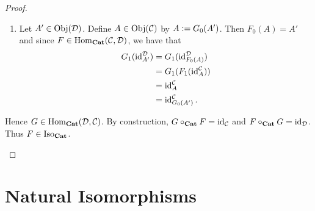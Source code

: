 \documentclass{book}
\begin{document}
\begin{proof}
\begin{itemize}
\begin{enumerate}
\begin{align*}
					G_1(g' \circ_{\MD} f')
					& = G_1(F_1(g) \circ_{\MD} F_1(f)) \\
					& = G_1(F_1( g \circ_{\MC} f)) \\
					& = g \circ_{\MC} f \\
					& = G_1(g') \circ_{\MC} G_1(f').
				\end{align*}
				\item Let $A' \in \operatorname{Obj}(\mathcal{D})$. Define $A \in \operatorname{Obj}(\mathcal{C})$ by $A \vcentcolon= G_0(A')$. Then $F_0(A) = A'$ and since $F \in \operatorname{Hom}_{\operatorname*{\text{\textbf{Cat}}}}(\mathcal{C}, \mathcal{D})$, we have that
				\begin{align*}
					G_1(\operatorname{id}_{A'}^{\mathcal{D}})
					& = G_1(\operatorname{id}_{F_0(A)}^{\mathcal{D}}) \\
					& = G_1(F_1(\operatorname{id}_A^{\mathcal{C}})) \\
					& = \operatorname{id}_A^{\mathcal{C}} \\
					& = \operatorname{id}_{G_0(A')}^{\mathcal{C}}. 
				\end{align*}
			\end{enumerate}
			Hence $G \in \operatorname{Hom}_{\operatorname*{\text{\textbf{Cat}}}}(\mathcal{D}, \mathcal{C})$. By construction, $G \circ_{\operatorname*{\text{\textbf{Cat}}}} F = \operatorname{id}_{\mathcal{C}}$ and $F \circ_{\operatorname*{\text{\textbf{Cat}}}} G = \operatorname{id}_{\mathcal{D}}$. Thus $F \in \operatorname{Iso}_{\operatorname*{\text{\textbf{Cat}}}}$.
		\end{itemize}
	\end{proof}
	
	
	
	
	
	
	
	
	
	
	
	
	
	
	
	
	
	
	
	
	
	
	
	
	
	
	
	
	
	
	
	
	
	
	
	
	
	
	
	
	
	
	
	
	
	
	
	
	
	
	
	\section{Natural Isomorphisms}
	
\end{document}
